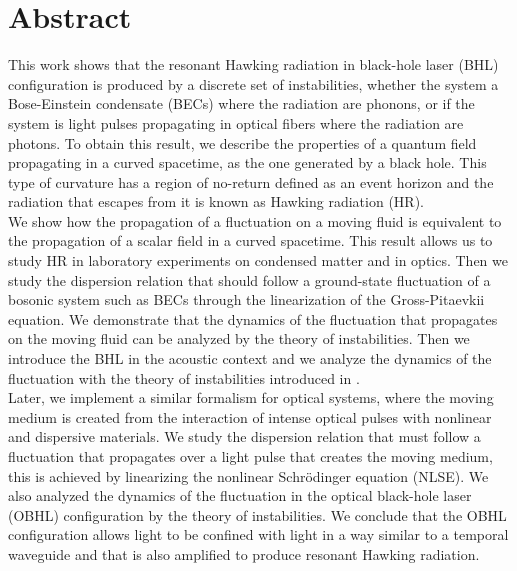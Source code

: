 \chapter*{Abstract}
This  work shows that the resonant Hawking radiation in black-hole laser (BHL) configuration is  produced by a discrete set of instabilities, whether the system a Bose-Einstein condensate (BECs) where the radiation are phonons, or if the system is light pulses propagating in optical fibers where the radiation are photons. To obtain this result, we describe the properties of a quantum field propagating in a curved spacetime, as the one generated by a black hole. This type of curvature has a region of no-return defined as an event horizon and the radiation that escapes from it is known as Hawking radiation (HR).\\

We show how the propagation of a fluctuation on a moving fluid is equivalent to the propagation of a scalar field in a curved spacetime. This result allows us to study HR in laboratory experiments on condensed matter and in optics. Then we study the dispersion relation that should follow a ground-state fluctuation of a bosonic system such as BECs through the linearization of the Gross-Pitaevkii equation. We demonstrate that the dynamics of the fluctuation that propagates on the moving fluid can be analyzed by the theory of instabilities. Then we introduce the BHL in the acoustic context and we analyze the dynamics of the fluctuation with the  theory of instabilities introduced in \cite{2018Bermudez}.\\

Later, we implement a similar formalism for optical systems, where the moving medium is created from the interaction of intense optical pulses with nonlinear and dispersive materials. We study the dispersion relation that must follow a fluctuation that propagates over a light pulse that creates the moving medium, this is achieved by linearizing the nonlinear Schrödinger equation (NLSE). We also analyzed the dynamics of the fluctuation in the  optical black-hole laser (OBHL) configuration  by the theory of instabilities. We conclude that the OBHL configuration allows light to be confined with light in a way similar to a temporal waveguide and that is also amplified to produce resonant Hawking radiation.